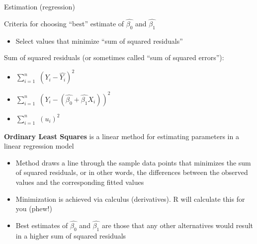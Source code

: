 \documentclass[
  8pt,
  ignorenonframetext,
  dvipsnames]{beamer}
\providecommand{\tightlist}{%
  \setlength{\itemsep}{0pt}\setlength{\parskip}{0pt}}
\renewcommand{\textbf}[1]{{\color{darkgray}\bfseries\fontfamily{Montserrat-TOsF}#1}}
\let\olditem\item
\renewcommand{\item}{%
  \olditem\vspace{4pt}
}
\begin{document}
\begin{frame}{Estimation (regression)}
\protect\hypertarget{estimation-regression-1}{}

Criteria for choosing ``best'' estimate of \(\hat{\beta_0}\) and
\(\hat{\beta_1}\)

\begin{itemize}
\tightlist
\item
  Select values that minimize ``sum of squared residuals''
\end{itemize}

\medskip

Sum of squared residuals (or sometimes called ``sum of squared
errors''):

\begin{itemize}
\item
  \(\sum_{i=1}^{n}\) \((Y_i - \hat{Y_i})^2\)
\item
  \(\sum_{i=1}^{n}\) \((Y_i - (\hat{\beta_0} + \hat{\beta_1}X_i))^2\)
\item
  \(\sum_{i=1}^{n}\) \((u_i)^2\)
\end{itemize}

\medskip

\textbf{Ordinary Least Squares} is a linear method for estimating
parameters in a linear regression model

\begin{itemize}
\tightlist
\item
  Method draws a line through the sample data points that minimizes the
  sum of squared residuals, or in other words, the differences between
  the observed values and the corresponding fitted values
\item
  Minimization is achieved via calculus (derivatives). R will calculate
  this for you (phew!)
\item
  Best estimates of \(\hat{\beta_0}\) and \(\hat{\beta_1}\) are those
  that any other alternatives would result in a higher sum of squared
  residuals
\end{itemize}

\end{frame}
\end{document}
